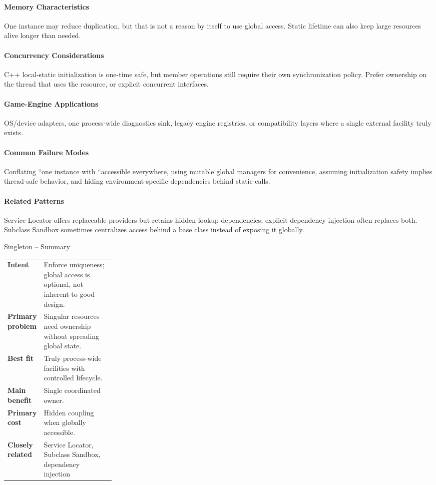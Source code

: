 \documentclass[11pt]{article}
\begin{document}
\paragraph{Memory Characteristics} One instance may reduce duplication, but that is not a reason by itself to use global access. Static lifetime can also keep large resources alive longer than needed.
\paragraph{Concurrency Considerations} C++ local-static initialization is one-time safe, but member operations still require their own synchronization policy. Prefer ownership on the thread that uses the resource, or explicit concurrent interfaces.
\paragraph{Game-Engine Applications} OS/device adapters, one process-wide diagnostics sink, legacy engine registries, or compatibility layers where a single external facility truly exists.
\paragraph{Common Failure Modes} Conflating ``one instance with ``accessible everywhere, using mutable global managers for convenience, assuming initialization safety implies thread-safe behavior, and hiding environment-specific dependencies behind static calls.
\paragraph{Related Patterns} Service Locator offers replaceable providers but retains hidden lookup dependencies; explicit dependency injection often replaces both. Subclass Sandbox sometimes centralizes access behind a base class instead of exposing it globally.

\begin{patternsummary}{Singleton -- Summary}
\begin{tabularx}{\linewidth}{@{}>{\bfseries}p{0.25\linewidth}X@{}}
Intent & Enforce uniqueness; global access is optional, not inherent to good design. \\
Primary problem & Singular resources need ownership without spreading global state. \\
Best fit & Truly process-wide facilities with controlled lifecycle. \\
Main benefit & Single coordinated owner. \\
Primary cost & Hidden coupling when globally accessible. \\
Closely related & Service Locator, Subclass Sandbox, dependency injection \\
\end{tabularx}
\end{patternsummary}
\end{document}
